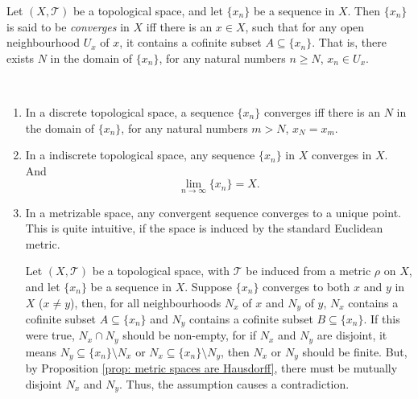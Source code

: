 \begin{definition}
	\label{def: convergence of sequences}
	Let $(X, \mathcal T)$ be a topological space, and let $\{x_n\}$ be a sequence in $X$. Then $\{x_n\}$ is said to be \textit{converges} in $X$ iff there is an $x \in X$, such that for any open neighbourhood $U_x$ of $x$, it contains a cofinite subset $A \subseteq \{x_n\}$. That is, there exists $N$ in the domain of $\{x_n\}$, for any natural numbers $n \ge N$, $x_n \in U_x$.
\end{definition}


\begin{example}
	\
	\begin{enumerate}
		\item
		In a discrete topological space, a sequence $\{x_n\}$ converges iff there is an $N$ in the domain of $\{x_n\}$, for any natural numbers $m > N$, $x_N = x_m$.
		
		\item
		In a indiscrete topological space, any sequence $\{x_n\}$ in $X$ converges in $X$. And
		$$
		\lim_{n \to \infty} \{x_n\} = X.
		$$
		
		\item
		In a metrizable space, any convergent sequence converges to a unique point. This is quite intuitive, if the space is induced by the standard Euclidean metric.
		
		Let $(X, \mathcal T)$ be a topological space, with $\mathcal T$ be induced from a metric $\rho$ on $X$, and let $\{x_n\}$ be a sequence in $X$. Suppose $\{x_n\}$ converges to both $x$ and $y$ in $X$ ($x \ne y$), then, for all neighbourhoods $N_x$  of $x$ and $N_y$ of $y$, $N_x$ contains a cofinite subset $A \subseteq \{x_n\}$ and $N_y$ contains a cofinite subset $B \subseteq \{x_n\}$. If this were true, $N_x \cap N_y$ should be non-empty, for if $N_x$ and $N_y$ are disjoint, it means $N_y \subseteq \{x_n\} \setminus N_x$ or $N_x \subseteq \{x_n\} \setminus N_y$, then $N_x$ or $N_y$ should be finite. But, by Proposition \ref{prop: metric spaces are Hausdorff}, there must be mutually disjoint $N_x$ and $N_y$. Thus, the assumption causes a contradiction.
	\end{enumerate}
\end{example}


